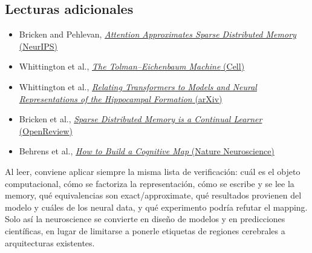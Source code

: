 \documentclass[a4paper]{article}
\begin{document}
\subsection{Lecturas adicionales}

\begin{itemize}
  \item Bricken and Pehlevan, \href{https://proceedings.neurips.cc/paper/2021/hash/8171ac2c5544a5cb54ac0f38bf477af4-Abstract.html}{\emph{Attention Approximates Sparse Distributed Memory} (NeurIPS)}
  \item Whittington et al., \href{https://www.sciencedirect.com/science/article/pii/S009286742031388X}{\emph{The Tolman--Eichenbaum Machine} (Cell)}
  \item Whittington et al., \href{https://arxiv.org/abs/2112.04035}{\emph{Relating Transformers to Models and Neural Representations of the Hippocampal Formation} (arXiv)}
  \item Bricken et al., \href{https://openreview.net/forum?id=JknGeelZJpHP}{\emph{Sparse Distributed Memory is a Continual Learner} (OpenReview)}
  \item Behrens et al., \href{https://www.nature.com/articles/s41593-022-01153-y}{\emph{How to Build a Cognitive Map} (Nature Neuroscience)}
\end{itemize}

Al leer, conviene aplicar siempre la misma lista de verificación: cuál es el objeto computacional, cómo se factoriza la representación, cómo se escribe y se lee la memory, qué equivalencias son exact/approximate, qué resultados provienen del modelo y cuáles de los neural data, y qué experimento podría refutar el mapping. Solo así la neuroscience se convierte en diseño de modelos y en predicciones científicas, en lugar de limitarse a ponerle etiquetas de regiones cerebrales a arquitecturas existentes.
\end{document}
